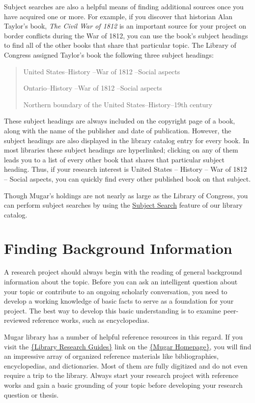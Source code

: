 \documentclass[book]{memoir}
\begin{document}
Subject searches are also a helpful means of finding additional sources once you have acquired one or more. For example, if you discover that historian Alan Taylor's book, \emph{The Civil War of 1812} is an important source for your project on border conflicts during the War of 1812, you can use the book's subject headings to find all of the other books that share that particular topic. The Library of Congress assigned Taylor's book the following three subject headings:

\begin{quote}
United States--History --War of 1812 --Social aspects

Ontario--History --War of 1812 --Social aspects

Northern boundary of the United States--History--19th century
\end{quote}

These subject headings are always included on the copyright page of a book, along with the name of the publisher and date of publication. However, the subject headings are also displayed in the library catalog entry for every book. In most libraries these subject headings are hyperlinked; clicking on any of them leads you to a list of every other book that shares that particular subject heading. Thus, if your research interest is United States -- History -- War of 1812 -- Social aspects, you can quickly find every other published book on that subject. 



Though Mugar's holdings are not nearly as large as the Library of Congress, you can perform subject searches by using the \href{http://library.bu.edu}{Subject Search} feature of our library catalog.

\section{Finding Background Information}

A research project should always begin with the reading of general background information about the topic. Before you can ask an intelligent question about your topic or contribute to an ongoing scholarly conversation, you need to develop a working knowledge of basic facts to serve as a foundation for your project. The best way to develop this basic understanding is to examine peer-reviewed reference works, such as encyclopedias.

Mugar library has a number of helpful reference resources in this regard. If you visit the \href{http://www.bu.edu/library/research/guides/research-guides}{\{Library Research Guides\}} link on the \href{http://www.bu.edu/library}{\{Mugar Homepage\}}, you will find an impressive array of organized reference materials like bibliographies, encyclopedias, and dictionaries. Most of them are fully digitized and do not even require a trip to the library. Always start your research project with reference works and gain a basic grounding of your topic before developing your research question or thesis.
\end{document}
